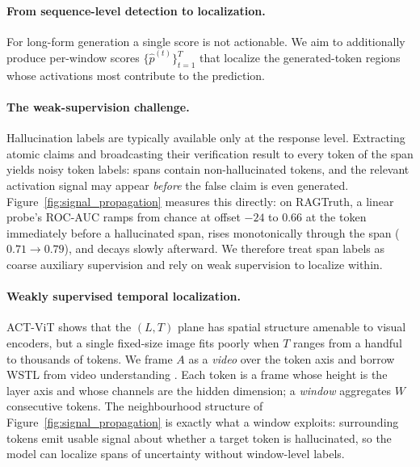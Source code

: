\paragraph{From sequence-level detection to localization.} For
long-form generation a single score is not actionable. We aim to
additionally produce per-window scores
$\{\hat{p}^{(t)}\}_{t=1}^{T}$ that localize the generated-token
regions whose activations most contribute to the prediction.



\paragraph{The weak-supervision challenge.} Hallucination labels are
typically available only at the response level. Extracting atomic
claims and broadcasting their verification result to every token of
the span yields noisy token labels: spans contain non-hallucinated
tokens, and the relevant activation signal may appear \emph{before}
the false claim is even generated.
Figure~\ref{fig:signal_propagation} measures this directly: on
RAGTruth, a linear probe's ROC-AUC ramps from chance at offset $-24$
to $0.66$ at the token immediately before a hallucinated span, rises
monotonically through the span ($0.71 \to 0.79$), and decays slowly
afterward. We therefore treat span labels as coarse auxiliary
supervision and rely on weak supervision to localize within.

\paragraph{Weakly supervised temporal localization.} ACT-ViT shows
that the $(L,T)$ plane has spatial structure amenable to visual
encoders, but a single fixed-size image fits poorly when $T$ ranges
from a handful to thousands of tokens. We frame $A$ as a \emph{video}
over the token axis and borrow WSTL from video understanding
\citep{pilhyeonlee2021}. Each token is a frame whose height is the
layer axis and whose channels are the hidden dimension; a
\emph{window} aggregates $W$ consecutive tokens. The neighbourhood
structure of Figure~\ref{fig:signal_propagation} is exactly what a
window exploits: surrounding tokens emit usable signal about whether
a target token is hallucinated, so the model can localize spans of
uncertainty without window-level labels.

